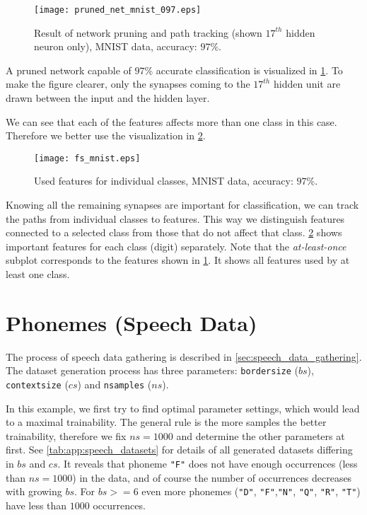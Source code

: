 \begin{figure}[H]
\centering
\texttt{[image: pruned\_net\_mnist\_097.eps]}
\caption{Result of network pruning and path tracking (shown $ 17^{th} $ hidden neuron only), MNIST data, accuracy: $ 97\% $.}
\label{fig:examples:pruned_net_mnist_097}
\end{figure}

A pruned network capable of $ 97\% $ accurate classification is visualized in \cref{fig:examples:pruned_net_mnist_097}. To make the figure clearer, only the synapses coming to the $ 17^{th} $ hidden unit are drawn between the input and the hidden layer.

We can see that each of the features affects more than one class in this case. Therefore we better use the visualization in \cref{fig:examples:fs_mnist}. 

\begin{figure}[H]
\centering
\texttt{[image: fs\_mnist.eps]}
\caption{Used features for individual classes, MNIST data, accuracy: $ 97\% $.}
\label{fig:examples:fs_mnist}
\end{figure}

Knowing all the remaining synapses are important for classification, we can track the paths from individual classes to features. This way we distinguish features connected to a selected class from those that do not affect that class. \cref{fig:examples:fs_mnist} shows important features for each class (digit) separately. Note that the \textit{at-least-once} subplot corresponds to the features shown in \cref{fig:examples:pruned_net_mnist_097}. It shows all features used by at least one class.

\section{Phonemes (Speech Data)} \label{sec:example_speech}
The process of speech data gathering is described in \cref{sec:speech_data_gathering}. The dataset generation process has three parameters: \texttt{border\textunderscore size} ($ bs $), \texttt{context\textunderscore size} ($ cs $) and \texttt{n\textunderscore samples} ($ ns $).

In this example, we first try to find optimal parameter settings, which would lead to a maximal trainability. The general rule is the more samples the better trainability, therefore we fix $ ns = 1000 $ and determine the other parameters at first. See \cref{tab:app:speech_datasets} for details of all generated datasets differing in $ bs $ and $ cs $. It reveals that phoneme \texttt{"F"} does not have enough occurrences (less than $ ns = 1000 $) in the data, and of course the number of occurrences decreases with growing $ bs $. For $ bs >= 6 $ even more phonemes (\texttt{"D"}, \texttt{"F"},\texttt{"N"}, \texttt{"Q"}, \texttt{"R"}, \texttt{"T"}) have less than $ 1000 $ occurrences.

